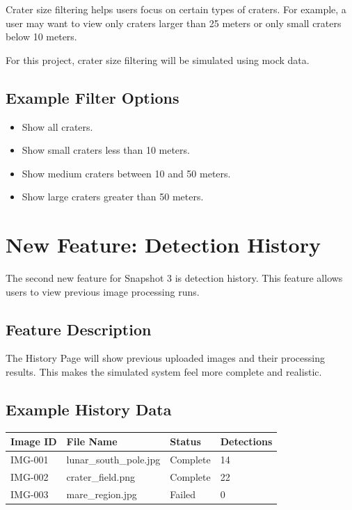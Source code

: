 \documentclass[12pt]{article}
\begin{document}
Crater size filtering helps users focus on certain types of craters. For example, a user may want to view only craters larger than 25 meters or only small craters below 10 meters.

For this project, crater size filtering will be simulated using mock data.

\subsection{Example Filter Options}

\begin{itemize}
    \item Show all craters.
    \item Show small craters less than 10 meters.
    \item Show medium craters between 10 and 50 meters.
    \item Show large craters greater than 50 meters.
\end{itemize}

\section{New Feature: Detection History}

The second new feature for Snapshot 3 is detection history. This feature allows users to view previous image processing runs.

\subsection{Feature Description}

The History Page will show previous uploaded images and their processing results. This makes the simulated system feel more complete and realistic.

\subsection{Example History Data}

\begin{longtable}{|p{1in}|p{1.7in}|p{1.5in}|p{1.2in}|}
\hline
\textbf{Image ID} & \textbf{File Name} & \textbf{Status} & \textbf{Detections} \\
\hline
IMG-001 & lunar\_south\_pole.jpg & Complete & 14 \\
\hline
IMG-002 & crater\_field.png & Complete & 22 \\
\hline
IMG-003 & mare\_region.jpg & Failed & 0 \\
\hline
\end{longtable}
\end{document}
